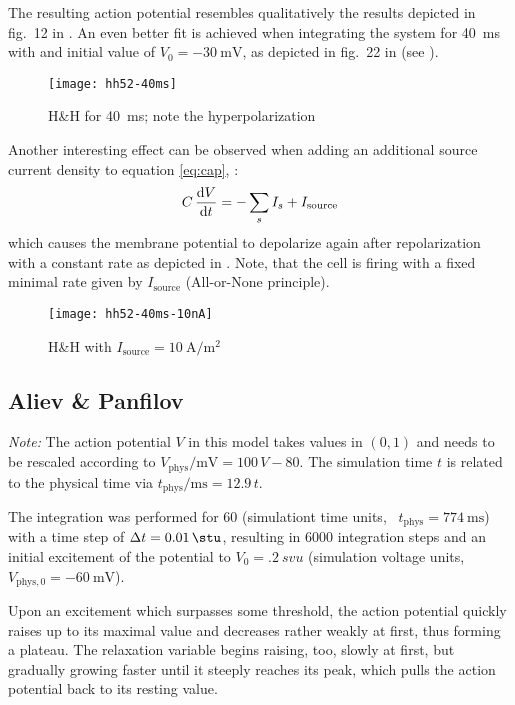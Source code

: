 The resulting action potential resembles qualitatively the results depicted in
fig.~12 in \cite{HH52}. An even better fit is achieved when integrating the
system for \SI{40}{\milli\second} with and initial value of
$V_0=\SI{-30}{\milli\volt}$, as depicted in fig.~22 in \cite{HH52} (see
).

\begin{figure}[h]
    \centering
    \texttt{[image: hh52-40ms]}
    \label{fig:hh2}
    \caption{H\&H for \SI{40}{\milli\second}; note the hyperpolarization}
\end{figure}

Another interesting effect can be observed when adding an additional source
current density to equation \eqref{eq:cap}, \ie:
\begin{equation*}
    C\,\dv{V}{t}=-\sum_{s}I_{s} + I_{\mathrm{source}}
\end{equation*}
which causes the membrane potential to depolarize again after repolarization
with a constant rate as depicted in . Note, that the cell is
firing with a fixed minimal rate given by $I_{\mathrm{source}}$ (All-or-None
principle).

\begin{figure}[h]
    \centering
    \texttt{[image: hh52-40ms-10nA]}
    \label{fig:hh3}
    \caption{H\&H with
        $I_{\mathrm{source}}=\SI{10}{\ampere\per\metre\squared}$}
\end{figure}


\subsection{Aliev \& Panfilov}
\emph{Note:} The action potential $V$ in this model takes values in $(0,1)$ and
needs to be rescaled according to
$V_{\mathrm{phys}}/\si{\milli\volt}=100\,V-80$. The simulation time $t$ is related
to the physical time via $t_{\mathrm{phys}}/\si{\milli\second}=12.9\,t$.

\vspace{\baselineskip}
The integration was performed for \SI{60}{\stu} (simulationt time units,
\ie~$t_{\mathrm{phys}}=\SI{774}{\milli\second}$) with a time step of
$\Delta{t}=\SI{.01}{\stu}$, resulting in 6000 integration steps and an initial
excitement of the potential to $V_0=\SI{.2}{svu}$ (simulation voltage units,
\ie~$V_{\mathrm{phys},0}=\SI{-60}{\milli\volt}$).

Upon an excitement which surpasses some threshold, the action potential quickly
raises up to its maximal value and decreases rather weakly at first, thus
forming a plateau. The relaxation variable begins raising, too, slowly at
first, but gradually growing faster until it steeply reaches its peak, which
pulls the action potential back to its resting value.

